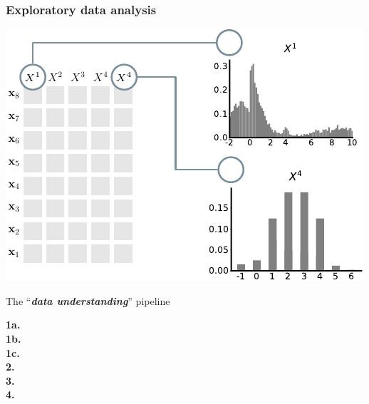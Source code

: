 \documentclass[xcolor={usenames,dvipsnames,svgnames}, compress, aspectratio=169, 11pt]{beamer}
\begin{document}
\begin{frame}[t, htt=bgrey2]
  \frametitle{Exploratory data analysis}
  \large
  \begin{minipage}[t]{0.6\linewidth}
    \vspace{5pt}
    \includegraphics[width=.9\linewidth]{figures/abda-hist-type}
  \end{minipage}\hfill\begin{minipage}[t]{0.4\linewidth}
    \vspace{10pt}
    {The ``\emph{\textbf{data understanding}}'' pipeline}\\[3pt]
    \raggedleft\begin{minipage}[t]{.9\linewidth}
      {\textbf{1a.} \\[-2pt]}
      {\textbf{1b.} \\[-2pt]}
      {\textbf{1c.}\hspace{1pt} \\[-2pt]}
      {\textbf{2.}\hspace{6pt} \\[-2pt]}
      {\textbf{3.}\hspace{6pt} \\[-2pt]}
      {\textbf{4.}\hspace{6pt} \\[-2pt]}
    \end{minipage}    
  \end{minipage}  
\end{frame}
\end{document}
